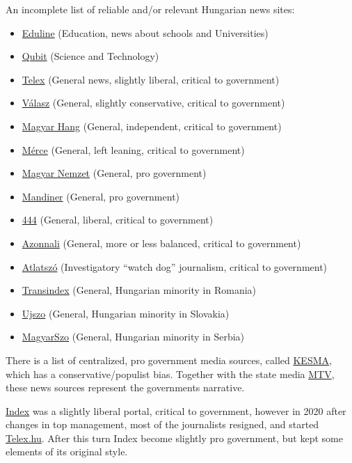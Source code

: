 \documentclass{article}
\begin{document}
An incomplete list of reliable and/or relevant Hungarian news sites:
\begin{itemize}
    \item \href{https://eduline.hu/}{Eduline} (Education, news about schools and Universities)
    \item \href{https://qubit.hu/}{Qubit} (Science and Technology)
    \item \href{https://telex.hu/}{Telex} (General news, slightly liberal, critical to government)
    \item \href{https://www.valaszonline.hu/}{Válasz} (General, slightly conservative, critical to government)
    \item \href{https://magyarhang.org/}{Magyar Hang} (General, independent, critical to government)
    \item \href{https://merce.hu/}{Mérce} (General, left leaning, critical to government)
    \item \href{https://magyarnemzet.hu/}{Magyar Nemzet} (General, pro government)
    \item \href{https://mandiner.hu/}{Mandiner} (General, pro government)
    \item \href{https://444.hu/}{444} (General, liberal, critical to government)
    \item \href{https://azonnali.hu/}{Azonnali} (General, more or less balanced, critical to government)
    \item \href{https://atlatszo.hu/}{Atlatszó} (Investigatory ``watch dog'' journalism, critical to government)
    \item \href{http://www.transindex.ro/}{Transindex} (General, Hungarian minority in Romania)
    \item \href{https://ujszo.com/}{Ujszo} (General, Hungarian minority in Slovakia)
    \item \href{https://www.magyarszo.rs/}{MagyarSzo} (General, Hungarian minority in Serbia)
\end{itemize}


There is a list of centralized, pro government media sources, called \href{https://cepmf.hu/}{KESMA}, which has a conservative/populist bias. Together with the state media \href{http://mtva.hu/}{MTV}, these news sources represent the governments narrative.

\href{https://index.hu/}{Index} was a slightly liberal portal, critical to government, however in 2020 after changes in top management, most of the journalists resigned, and started \href{https://telex.hu/}{Telex.hu}. After this turn Index become slightly pro government, but kept some elements of its original style.
\end{document}
